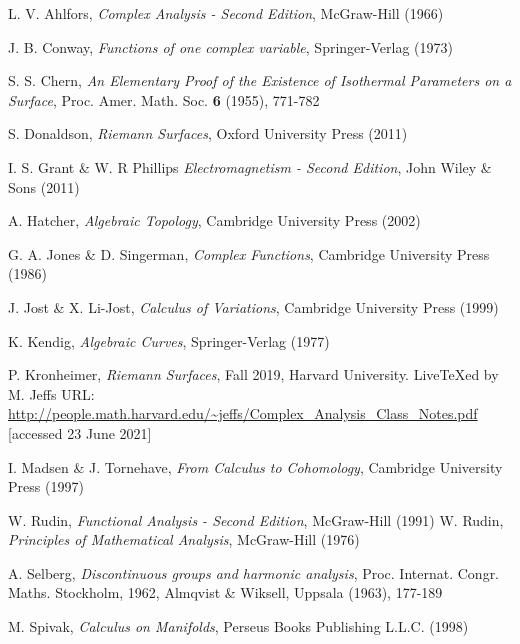 \documentclass[11pt]{report}
\theoremstyle{definition}
\begin{document}
\begin{thebibliography}{99}
 L. V. Ahlfors, {\em Complex Analysis - Second Edition}, McGraw-Hill (1966)

 J. B. Conway, {\em Functions of one complex variable}, Springer-Verlag (1973)

 S. S. Chern, {\em An Elementary Proof of the Existence of Isothermal Parameters on a Surface}, Proc. Amer. Math. Soc. \textbf{6} (1955), 771-782

 S. Donaldson, {\em Riemann Surfaces}, Oxford University Press (2011)

 I. S. Grant \& W. R Phillips {\em Electromagnetism - Second Edition}, John Wiley \& Sons (2011)

 A. Hatcher, {\em Algebraic Topology}, Cambridge University Press (2002)

 G. A. Jones \& D. Singerman, {\em Complex Functions}, Cambridge University Press (1986)

 J. Jost \& X. Li-Jost, {\em Calculus of Variations}, Cambridge University Press (1999)

 K. Kendig, {\em Algebraic Curves}, Springer-Verlag (1977)

 P. Kronheimer, {\em Riemann Surfaces}, Fall 2019, Harvard University. LiveTeXed by M. Jeffs URL: \url{http://people.math.harvard.edu/~jeffs/Complex_Analysis_Class_Notes.pdf} [accessed 23 June 2021]

 I. Madsen \& J. Tornehave, {\em From Calculus to Cohomology}, Cambridge University Press (1997)

 W. Rudin, {\em Functional Analysis - Second Edition}, McGraw-Hill (1991)
 W. Rudin, {\em Principles of Mathematical Analysis}, McGraw-Hill (1976)

 A. Selberg, {\em Discontinuous groups and harmonic analysis}, Proc. Internat. Congr. Maths. Stockholm, 1962, Almqvist \& Wiksell, Uppsala (1963), 177-189

 M. Spivak, {\em Calculus on Manifolds}, Perseus Books Publishing L.L.C. (1998)


\end{thebibliography}
\end{document}
